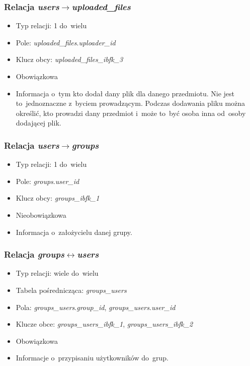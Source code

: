 \documentclass[a4paper,12pt,oneside]{report}
\begin{document}
\subsubsection{Relacja \emph{users}$\to$\emph{uploaded\_files}}
\label{subsub:users-uploaded_files}
\begin{itemize}
  \item Typ relacji: 1 do~wielu
  \item Pole: \emph{uploaded\_files}.\emph{uploader\_id}
  \item Klucz obcy: \emph{uploaded\_files\_ibfk\_3}
  \item Obowiązkowa
  \item Informacja o~tym kto dodał dany plik dla danego przedmiotu. Nie jest to~jednoznaczne z~byciem prowadzącym. Podczas dodawania pliku można określić, kto prowadzi dany przedmiot i~może to~być osoba inna od~osoby dodającej plik.
\end{itemize}

\subsubsection{Relacja \emph{users}$\to$\emph{groups}}
\label{subsub:users-groups}
\begin{itemize}
  \item Typ relacji: 1 do~wielu
  \item Pole: \emph{groups}.\emph{user\_id}
  \item Klucz obcy: \emph{groups\_ibfk\_1}
  \item Nieobowiązkowa
  \item Informacja o~założycielu danej grupy.
\end{itemize}

\subsubsection{Relacja \emph{groups}$\leftrightarrow$\emph{users}}
\label{subsub:groups-users}
\begin{itemize}
  \item Typ relacji: wiele do~wielu
  \item Tabela pośrednicząca: \emph{groups\_users}
  \item Pola: \emph{groups\_users}.\emph{group\_id}, \emph{groups\_users}.\emph{user\_id}
  \item Klucze obce: \emph{groups\_users\_ibfk\_1}, \emph{groups\_users\_ibfk\_2}
  \item Obowiązkowa
  \item Informacje o~przypisaniu użytkowników do~grup.
\end{itemize}
\end{document}
